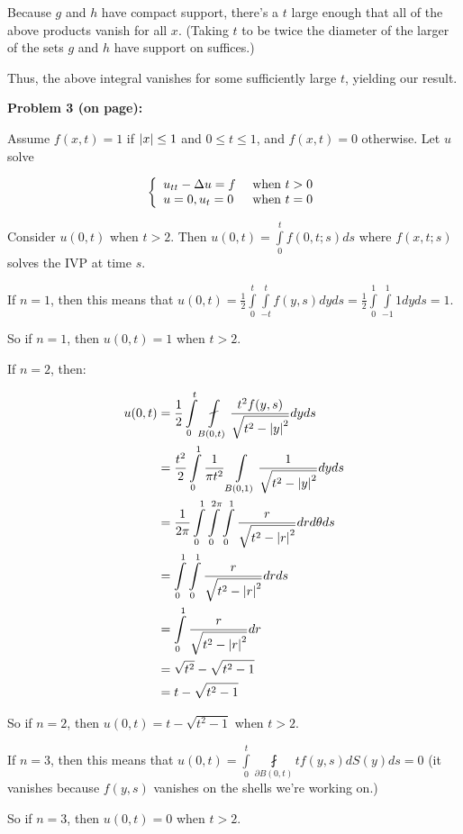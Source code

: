 \documentclass[a4paper,12pt]{article}
\begin{document}
Because $g$ and $h$ have compact support, there's a $t$ large enough that all of the above products vanish for all $x$. (Taking $t$ to be twice the diameter of the larger of the sets $g$ and $h$ have support on suffices.)

Thus, the above integral vanishes for some sufficiently large $t$, yielding our result.

\shunt

{\bf Problem 3 (on page):}

Assume $f(x,t) = 1$ if $\left\lvert x \right\rvert \leq 1$ and $0\leq t \leq 1$, and $f(x,t) = 0$ otherwise. Let $u$ solve

\begin{displaymath}
   \left\{
     \begin{array}{lr}
       u_{tt} - \Delta u = f  & \text{ when } t>0 \\
       u=0, u_t = 0 & \text{ when } t=0 \\
     \end{array}
   \right.
\end{displaymath}

Consider $u(0,t)$ when $t>2$. Then $u(0,t) = \int\limits_0^t f(0,t;s) ds$ where $f(x,t;s)$ solves the IVP at time $s$.

If $n = 1$, then this means that $u(0,t) = \frac{1}{2}\int\limits_0^t \int\limits_{-t}^{t} f(y,s) dy ds = \frac{1}{2}\int\limits_0^1 \int\limits_{-1}^{1} 1 dy ds = 1$.

So if $n=1$, then $u(0,t) = 1$ when $t >2$.  %

If $n = 2$, then:

\begin{align*}
u(0,t) &= \frac{1}{2} \int\limits_0^t \fint\limits_{B(0,t)} \frac{t^2f(y,s)}{\sqrt{t^2-\absval{y}^2}} dy ds\\
&= \frac{t^2}{2} \int\limits_0^1 \frac{1}{\pi t^2} \int\limits_{B(0,1)} \frac{1}{\sqrt{t^2-\absval{y}^2}} dy ds\\
&= \frac{1}{2 \pi} \int\limits_0^1 \int\limits_0^{2\pi}\int\limits_0^1 \frac{r}{\sqrt{t^2-\absval{r}^2}} dr d\theta ds\\
&=\int\limits_0^1\int\limits_0^1 \frac{r}{\sqrt{t^2-\absval{r}^2}} dr ds\\
&=\int\limits_0^1 \frac{r}{\sqrt{t^2-\absval{r}^2}} dr \\
&= \sqrt{t^2} - \sqrt{t^2-1}\\
&= t - \sqrt{t^2-1}
\end{align*} %

So if $n = 2$, then $u(0,t) = t - \sqrt{t^2-1}$ when $t>2$.

If $n = 3$, then this means that $u(0,t) = \int\limits_0^t\fint\limits_{\partial B(0,t)} tf(y,s) dS(y)ds = 0$ (it vanishes because $f(y,s)$ vanishes on the shells we're working on.)

So if $n=3$, then $u(0,t) = 0$ when $t>2$. 

\shunt
\end{document}
